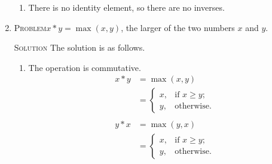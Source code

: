 \documentclass{amsart}
\newcommand{\Solution}{\textsc{Solution}\xspace}
\newcommand{\Problem}{\textsc{Problem}\xspace}
\begin{document}
\begin{enumerate}
\begin{enumerate}
      \item There is no identity element, so there are no inverses.
   \end{enumerate}

   \item \Problem $x * y = \max(x,y)$, the larger of the two numbers $x$ and $y$.

   \noindent \Solution The solution is as follows.

   \begin{enumerate}
      
      \item The operation is commutative.
      \begin{align*}
         x * y & = \max(x,y)    \\
	       & =
	       \begin{cases}
	          x,       & \text{if $x \ge y$;} \\
		  y,       & \text{otherwise.}
	       \end{cases} \\
	       \\
	 y * x & = \max(y,x)   \\
	       & =
	       \begin{cases}
	          x,       & \text{if $x \ge y$;} \\
		  y,       & \text{otherwise.}
	       \end{cases}
      \end{align*}


\end{enumerate}
\end{enumerate}
\end{document}
